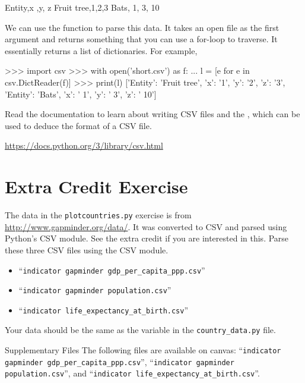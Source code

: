 \documentclass[11pt]{cselabheader}
\begin{document}
\begin{verbatimcode}
Entity,x         ,y,  z
Fruit tree,1,2,3
Bats, 1, 3, 10
\end{verbatimcode}

We can use the  function to parse this data.
It takes an open file as the first argument and returns something that you
can use a for-loop to traverse. It essentially returns a list of dictionaries.
For example,

\begin{pyconcode}
>>> import csv
>>> with open('short.csv') as f:
...     l = [e for e in csv.DictReader(f)]
>>> print(l)
[{'Entity': 'Fruit tree', 'x': '1', 'y': '2', 'z': '3'},
 {'Entity': 'Bats', 'x': ' 1', 'y': ' 3', 'z': ' 10'}]
\end{pyconcode}

Read the documentation to learn about writing CSV files and the
, which can be used to deduce the format of
a CSV file.

\begin{center}
\url{https://docs.python.org/3/library/csv.html}
\end{center}

\section{Extra Credit Exercise}
\begin{extraex}[parsecsv.py]
The data in the \texttt{plotcountries.py} exercise is from
\url{http://www.gapminder.org/data/}. It was converted to CSV and
parsed using Python's CSV module. See the extra credit if you are
interested in this.  Parse these three CSV files using the CSV module.

\begin{itemize}
\item ``\texttt{indicator gapminder gdp\_per\_capita\_ppp.csv}''
\item ``\texttt{indicator gapminder population.csv}''
\item ``\texttt{indicator life\_expectancy\_at\_birth.csv}''
\end{itemize}

Your data should be the same as the  variable in
the \texttt{country\_data.py} file.
\end{extraex}

\begin{infobox}{Supplementary Files}
The following files are available on canvas:
``\texttt{indicator gapminder gdp\_per\_capita\_ppp.csv}'',
``\texttt{indicator gapminder population.csv}'',
and ``\texttt{indicator life\_expectancy\_at\_birth.csv}''.
\end{infobox}
\end{document}
